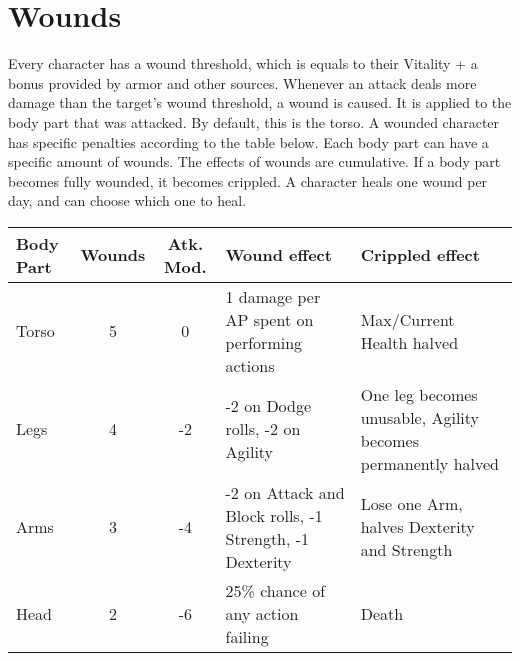 \section{Wounds}
Every character has a wound threshold, which is equals to their Vitality + a bonus provided by armor and other sources. Whenever an attack deals more damage than the target's wound threshold, a wound is caused. It is applied to the body part that was attacked. By default, this is the torso. A wounded character has specific penalties according to the table below. Each body part can have a specific amount of wounds. The effects of wounds are cumulative. If a body part becomes fully wounded, it becomes crippled.
A character heals one wound per day, and can choose which one to heal.


\begin{tabular}{p{1cm} | c | c | p{4cm} | p{4cm}}
Body Part & Wounds & Atk. Mod. & Wound effect & Crippled effect \\ \hline
Torso & 5 & 0 & 1 damage per AP spent on performing actions & Max/Current Health halved\\
Legs & 4 & -2 & -2 on Dodge rolls, -2 on Agility & One leg becomes unusable, Agility becomes permanently halved \\
Arms & 3 & -4 & -2 on Attack and Block rolls, -1 Strength, -1 Dexterity & Lose one Arm, halves Dexterity and Strength\\
Head & 2 & -6 & 25\% chance of any action failing & Death\\
\end{tabular}
